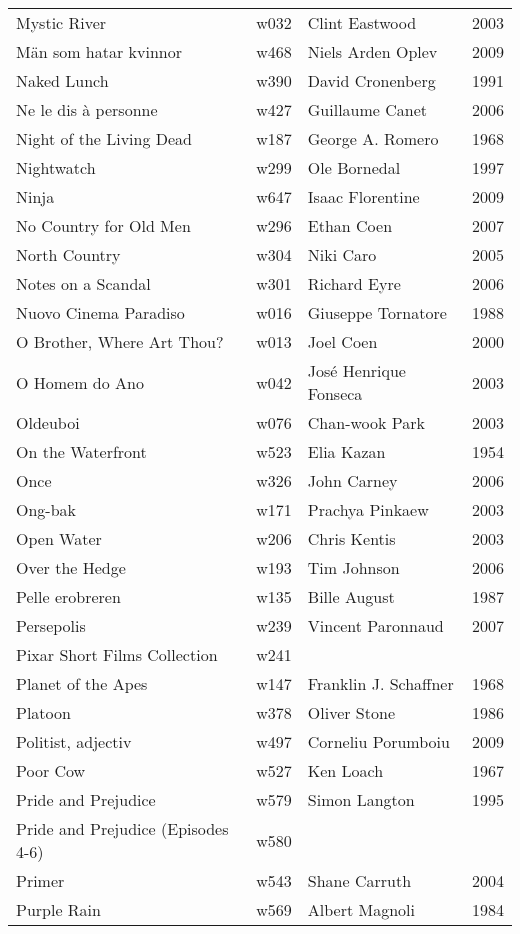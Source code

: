\documentclass{article}
\begin{document}
\begin {center}
\begin{longtable}{p{10cm} l l l}
Mystic River & w032 & Clint Eastwood & 2003 \\
Män som hatar kvinnor & w468 & Niels Arden Oplev & 2009 \\
Naked Lunch & w390 & David Cronenberg & 1991 \\
Ne le dis à personne & w427 & Guillaume Canet & 2006 \\
Night of the Living Dead & w187 & George A. Romero & 1968 \\
Nightwatch & w299 & Ole Bornedal & 1997 \\
Ninja & w647 & Isaac Florentine & 2009 \\
No Country for Old Men & w296 & Ethan Coen & 2007 \\
North Country & w304 & Niki Caro & 2005 \\
Notes on a Scandal & w301 & Richard Eyre & 2006 \\
Nuovo Cinema Paradiso & w016 & Giuseppe Tornatore & 1988 \\
O Brother, Where Art Thou? & w013 & Joel Coen & 2000 \\
O Homem do Ano & w042 & José Henrique Fonseca & 2003 \\
Oldeuboi & w076 & Chan-wook Park & 2003 \\
On the Waterfront & w523 & Elia Kazan & 1954 \\
Once & w326 & John Carney & 2006 \\
Ong-bak & w171 & Prachya Pinkaew & 2003 \\
Open Water & w206 & Chris Kentis & 2003 \\
Over the Hedge & w193 & Tim Johnson & 2006 \\
Pelle erobreren & w135 & Bille August & 1987 \\
Persepolis & w239 & Vincent Paronnaud & 2007 \\
Pixar Short Films Collection & w241 &  &  \\
Planet of the Apes & w147 & Franklin J. Schaffner & 1968 \\
Platoon & w378 & Oliver Stone & 1986 \\
Politist, adjectiv & w497 & Corneliu Porumboiu & 2009 \\
Poor Cow & w527 & Ken Loach & 1967 \\
Pride and Prejudice & w579 & Simon Langton & 1995 \\
Pride and Prejudice (Episodes 4-6) & w580 &  &  \\
Primer & w543 & Shane Carruth & 2004 \\
Purple Rain & w569 & Albert Magnoli & 1984 \\

\end{longtable}
\end{center}
\end{document}
